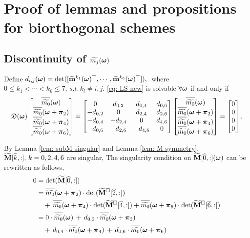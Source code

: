 \section{Proof of lemmas and propositions for biorthogonal schemes}\label{app: lemmas}

\subsection{Discontinuity of $\widetilde{m_{j}}(\boldsymbol{\omega})$}\label{app: discontinuity}
\begin{lemma}\label{lem: subM-singular-sys}
Define $d_{i,j}(\boldsymbol{\omega}) = \det([\widetilde{\mathbf{m}}^{k_1}(\boldsymbol{\omega})^\top,\cdots,\widetilde{\mathbf{m}}^{k_6}(\boldsymbol{\omega})^\top]),\;$ where $0\leq k_1<\cdots<k_6\leq 7,\, s.t.\, k_l\neq i,j.$
\eqref{eq: LS-new} is solvable $\forall \boldsymbol{\omega}$ if and only if \vspace{.5em}
\begin{align}
\label{eq: singular-cond}
\mathfrak{D}(\V{\omega})\begin{bmatrix}
\sbarm{0}\\
\sbarmp{0}{2}\\
\sbarmp{0}{4}\\
\sbarmp{0}{6}
\end{bmatrix}
\doteq
\begin{bmatrix}
0 & d_{0,2} & d_{0,4} & d_{0,6}\\
-d_{0,2} & 0 & d_{2,4} & d_{2,6}\\
-d_{0,4} & -d_{2,4} & 0 & d_{4,6}\\
-d_{0,6} & -d_{2,6} & -d_{4,6} & 0
\end{bmatrix}
\begin{bmatrix}
\sbarm{0}\\
\sbarmp{0}{2}\\
\sbarmp{0}{4}\\
\sbarmp{0}{6}
\end{bmatrix}
= \begin{bmatrix}
0\\0\\0\\0
\end{bmatrix}.
\end{align}
\end{lemma}
By Lemma \ref{lem: subM-singular} and Lemma \ref{lem: M-symmetry},  $\widetilde{\mathbf{M}}[\widehat{k},:],\,k=0,2,4,6$ are singular,
The singularity condition on  $\widetilde{\mathbf{M}}[\widehat{0},:](\boldsymbol{\omega})$ can be rewritten as follows,
\begin{align}\label{eq: singular-omega}
0 &=\det(\M[\widehat{0},:]) \notag\\
&=  \sbarmp{0}{2}\cdot\det(\Msub[\widehat{2},:])\notag\\
&\quad+ \,\sbarmp{0}{4}\cdot\det(\Msub[\widehat{4},:])
+ \sbarmp{0}{6}\cdot\det(\Msub[\widehat{6},:])\notag\\
&= 0\cdot\sbarm{0}\,+\,d_{0,2}\cdot\sbarmp{0}{2} \notag\\
&\quad+\,d_{0,4}\cdot \sbarmp{0}{4}\,+\, d_{0,6}\cdot\sbarmp{0}{6}
\end{align}
